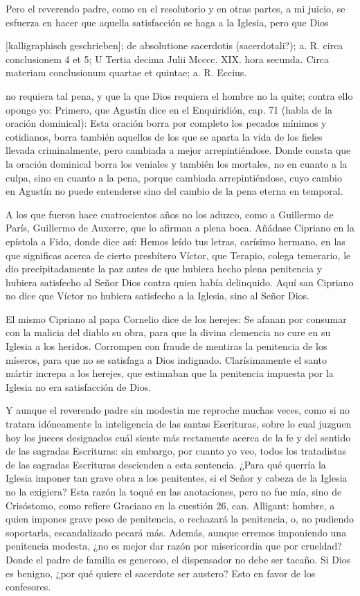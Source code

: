 \marginpar{\small[374]} Pero el reverendo padre, como en el resolutorio y en otras partes, a mi juicio, se esfuerza en hacer que aquella satisfacción se haga a la Iglesia, pero que Dios

[kalligraphisch geschrieben]; de absolutione sacerdotis (sacerdotali?); a. R. circa conclusionem 4 et 5; U Tertia decima Julii Mcccc. XIX. hora secunda. Circa materiam conclusionum quartae et quintae; a. R. Eccius.

no requiera tal pena, y que la que Dios requiera el hombre no la quite; contra ello opongo yo: Primero, que Agustín dice en el Enquiridión, cap. 71 (habla de la oración dominical): Esta oración borra por completo los pecados mínimos y cotidianos, borra también aquellos de los que se aparta la vida de los fieles llevada criminalmente, pero cambiada a mejor arrepintiéndose. Donde consta que la oración dominical borra los veniales y también los mortales, no en cuanto a la culpa, sino en cuanto a la pena, porque cambiada arrepintiéndose, cuyo cambio en Agustín no puede entenderse sino del cambio de la pena eterna en temporal.

A los que fueron hace cuatrocientos años no los aduzco, como a Guillermo de París, Guillermo de Auxerre, que lo afirman a plena boca. Añádase Cipriano en la epístola a Fido, donde dice así: Hemos leído tus letras, carísimo hermano, en las que significas acerca de cierto presbítero Víctor, que Terapio, colega temerario, le dio precipitadamente la paz antes de que hubiera hecho plena penitencia y hubiera satisfecho al Señor Dios contra quien había delinquido. Aquí san Cipriano no dice que Víctor no hubiera satisfecho a la Iglesia, sino al Señor Dios.

El mismo Cipriano al papa Cornelio dice de los herejes: Se afanan por consumar con la malicia del diablo su obra, para que la divina clemencia no cure en su Iglesia a los heridos. Corrompen con fraude de mentiras la penitencia de los míseros, para que no se satisfaga a Dios indignado. Clarísimamente el santo mártir increpa a los herejes, que estimaban que la penitencia impuesta por la Iglesia no era satisfacción de Dios.

Y aunque el reverendo padre sin modestia me reproche muchas veces, como si no tratara idóneamente la inteligencia de las santas Escrituras, sobre lo cual juzguen hoy los jueces designados cuál siente más rectamente acerca de la fe y del sentido de las sagradas Escrituras: sin embargo, por cuanto yo veo, todos los tratadistas de las sagradas Escrituras descienden a esta sentencia. ¿Para qué querría la Iglesia imponer tan grave obra a los penitentes, si el Señor y cabeza de la Iglesia no la exigiera? Esta razón la toqué en las anotaciones, pero no fue mía, sino de Crisóstomo, como refiere Graciano en la cuestión 26, can. Alligant: hombre, a quien impones grave peso de penitencia, o rechazará la penitencia, o, no pudiendo soportarla, escandalizado pecará más. Además, aunque erremos imponiendo una penitencia modesta, ¿no es mejor dar razón por misericordia que por crueldad? Donde el padre de familia es generoso, el dispensador no debe ser tacaño. Si Dios es benigno, ¿por qué quiere el sacerdote ser austero? Esto en favor de los confesores.

